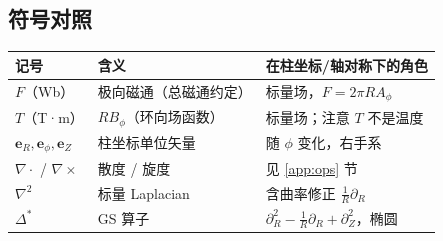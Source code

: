 \documentclass[12pt,fontset=none]{ctexart}
\numberwithin{equation}{section}
\numberwithin{table}{section}
\numberwithin{figure}{section}
\begin{document}
\subsection{符号对照}\label{app:symbols}

\begin{center}
\begin{tabular}{@{}l l l@{}}
\toprule
记号 & 含义 & 在柱坐标/轴对称下的角色 \\
\midrule
$F$（Wb） & 极向磁通（总磁通约定） & 标量场，$F=2\pi RA_\phi$ \\
$T$（T·m） & $RB_\phi$（环向场函数） & 标量场；注意 $T$ 不是温度 \\
$\bm{e}_R,\bm{e}_\phi,\bm{e}_Z$ & 柱坐标单位矢量 & 随 $\phi$ 变化，右手系 \\
$\nabla\cdot$ / $\nabla\times$ & 散度 / 旋度 & 见 \ref{app:ops} 节 \\
$\nabla^2$ & 标量 Laplacian & 含曲率修正 $\frac1R\partial_R$ \\
$\Delta^*$ & GS 算子 & $\partial_R^2-\frac1R\partial_R+\partial_Z^2$，椭圆 \\
\bottomrule
\end{tabular}
\end{center}
\end{document}

